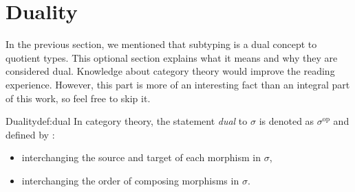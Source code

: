 \section{Duality}
In the previous section, we mentioned that subtyping is a dual concept to quotient types. This optional section explains what it means and why they are considered dual. Knowledge about category theory would improve the reading experience. However, this part is more of an interesting fact than an integral part of this work, so feel free to skip it.
\begin{defi}[]{Duality}{def:dual}
In category theory, the statement \emph{dual} to $\sigma$ is denoted as $\sigma^{\textrm{op}}$ and defined by \cite{CategoryTheory}:
\begin{itemize}
    \itemsep 0em 
    \item interchanging the source and target of each morphism in $\sigma$,
    \item interchanging the order of composing morphisms in $\sigma$.
\end{itemize}
\end{defi}

